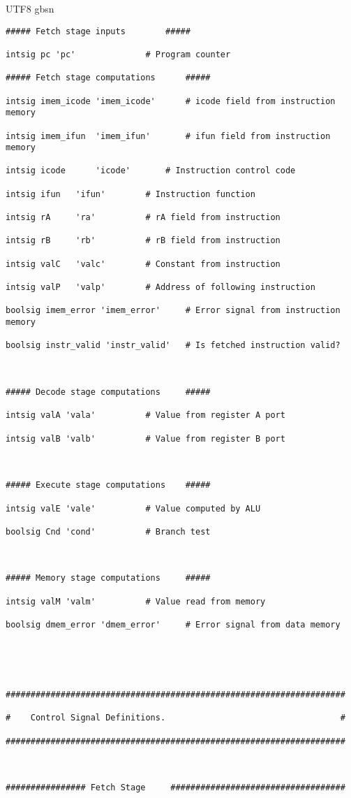 \documentclass {article}
\begin{document}
\begin {CJK*} {UTF8} {gbsn}
\begin{lstlisting}
##### Fetch stage inputs		#####

intsig pc 'pc'				# Program counter

##### Fetch stage computations		#####

intsig imem_icode 'imem_icode'		# icode field from instruction memory

intsig imem_ifun  'imem_ifun' 		# ifun field from instruction memory

intsig icode	  'icode'		# Instruction control code

intsig ifun	  'ifun'		# Instruction function

intsig rA	  'ra'			# rA field from instruction

intsig rB	  'rb'			# rB field from instruction

intsig valC	  'valc'		# Constant from instruction

intsig valP	  'valp'		# Address of following instruction

boolsig imem_error 'imem_error'		# Error signal from instruction memory

boolsig instr_valid 'instr_valid'	# Is fetched instruction valid?



##### Decode stage computations		#####

intsig valA	'vala'			# Value from register A port

intsig valB	'valb'			# Value from register B port



##### Execute stage computations	#####

intsig valE	'vale'			# Value computed by ALU

boolsig Cnd	'cond'			# Branch test



##### Memory stage computations		#####

intsig valM	'valm'			# Value read from memory

boolsig dmem_error 'dmem_error'		# Error signal from data memory





####################################################################

#    Control Signal Definitions.                                   #

####################################################################



################ Fetch Stage     ###################################




\end{lstlisting}
\end{CJK*}
\end{document}
